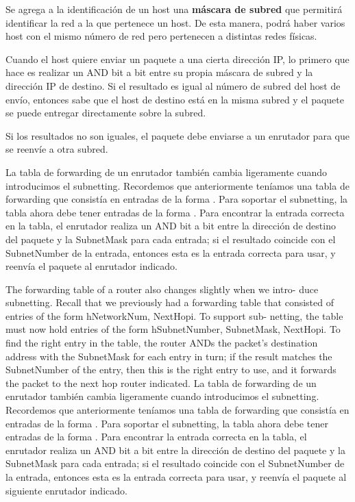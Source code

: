 Se agrega a la identificación de un host una \textbf{máscara de subred} que permitirá identificar la red a la que pertenece un host. De esta manera, podrá haber varios host con el mismo número de red pero pertenecen a distintas redes físicas. 

Cuando el host quiere enviar un paquete a una cierta dirección IP, lo primero que hace es realizar un AND bit a bit entre su propia máscara de subred y la dirección IP de destino. Si el resultado es igual al número de subred del host de envío, entonces sabe que el host de destino está en la misma subred y el paquete se puede entregar directamente sobre la subred.

Si los resultados no son iguales, el paquete debe enviarse a un enrutador para que se reenvíe a otra subred.

La tabla de forwarding de un enrutador también cambia ligeramente cuando introducimos el subnetting. Recordemos que anteriormente teníamos una tabla de forwarding que consistía en entradas de la forma \(<NetworkNum, NextHop>\). Para soportar el subnetting, la tabla ahora debe tener entradas de la forma \(<SubnetNumber, SubnetMask, NextHop>\). Para encontrar la entrada correcta en la tabla, el enrutador realiza un AND bit a bit entre la dirección de destino del paquete y la SubnetMask para cada entrada; si el resultado coincide con el SubnetNumber de la entrada, entonces esta es la entrada correcta para usar, y reenvía el paquete al enrutador indicado.

The forwarding table of a router also changes slightly when we intro-
duce subnetting. Recall that we previously had a forwarding table that
consisted of entries of the form hNetworkNum, NextHopi. To support sub-
netting, the table must now hold entries of the form hSubnetNumber,
SubnetMask, NextHopi. To find the right entry in the table, the router
ANDs the packet’s destination address with the SubnetMask for each
entry in turn; if the result matches the SubnetNumber of the entry, then
this is the right entry to use, and it forwards the packet to the next hop
router indicated.
La tabla de forwarding de un enrutador también cambia ligeramente cuando introducimos el subnetting. Recordemos que anteriormente teníamos una tabla de forwarding que consistía en entradas de la forma \(<NetworkNum, NextHop>\). Para soportar el subnetting, la tabla ahora debe tener entradas de la forma \(<SubnetNumber, SubnetMask, NextHop>\). Para encontrar la entrada correcta en la tabla, el enrutador realiza un AND bit a bit entre la dirección de destino del paquete y la SubnetMask para cada entrada; si el resultado coincide con el SubnetNumber de la entrada, entonces esta es la entrada correcta para usar, y reenvía el paquete al siguiente enrutador indicado.


